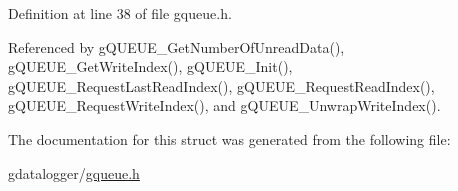 Definition at line 38 of file gqueue.h.



Referenced by gQUEUE\_\-GetNumberOfUnreadData(), gQUEUE\_\-GetWriteIndex(), gQUEUE\_\-Init(), gQUEUE\_\-RequestLastReadIndex(), gQUEUE\_\-RequestReadIndex(), gQUEUE\_\-RequestWriteIndex(), and gQUEUE\_\-UnwrapWriteIndex().



The documentation for this struct was generated from the following file:\begin{DoxyCompactItemize}
\item 
gdatalogger/\hyperlink{gqueue_8h}{gqueue.h}\end{DoxyCompactItemize}
